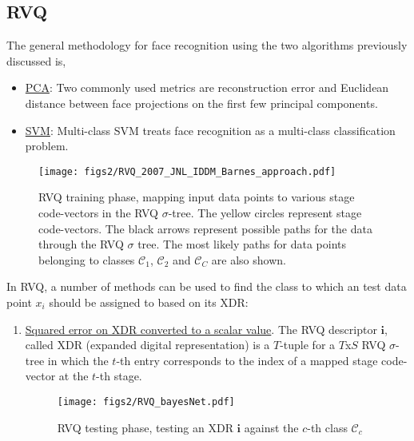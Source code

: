 \begin{Body}
\subsection{RVQ}
\label{subsec:RVQ}
The general methodology for face recognition using the two algorithms previously discussed is,

\begin{itemize}
\item \underline{PCA}: Two commonly used metrics are reconstruction error and Euclidean distance between face projections on the first few principal components.
\item \underline{SVM}: Multi-class SVM treats face recognition as a multi-class classification problem.  
\end{itemize}
								\begin{figure}[t]
								\centering
								\texttt{[image: figs2/RVQ\_2007\_JNL\_IDDM\_Barnes\_approach.pdf]}
								\caption{RVQ training phase, mapping input data points to various stage code-vectors in the RVQ $\sigma$-tree.  The yellow circles represent stage code-vectors.  The black arrows represent possible paths for the data through the RVQ $\sigma$ tree.  The most likely paths for data points belonging to classes $\mathcal{C}_1$, $\mathcal{C}_2$ and $\mathcal{C}_C$ are also shown.}
								\label{fig:RVQ_2007_JNL_IDDM_Barnes_approach}
								\end{figure}



In RVQ, a number of methods can be used to find the class to which an test data point $x_i$ should be assigned to based on its XDR:

\begin{enumerate}
\item \underline{Squared error on XDR converted to a scalar value}.  The RVQ descriptor $\mathbf{i}$, called XDR (expanded digital representation) \cite{2007_JNL_IDDM_Barnes} is a $T$-tuple for a $T$x$S$ RVQ $\sigma$-tree in which the $t$-th entry corresponds to the index of a mapped stage code-vector at the $t$-th stage.  
							\begin{figure}[t]
							\centering
							\texttt{[image: figs2/RVQ\_bayesNet.pdf]}
							\caption{RVQ testing phase, testing an XDR $\mathbf{i}$ against the $c$-th class $\mathcal{C}_c$}
							\label{fig:RVQ_bayesNet.pdf}
							\end{figure}





\end{enumerate}
\end{Body}
